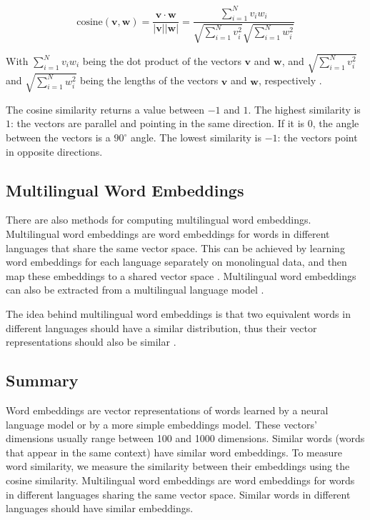 \begin{equation}
	\text{cosine}(\mathbf{v}, \mathbf{w}) =
	\frac{
	\mathbf{v} \cdot \mathbf{w}
	}{|\mathbf{v}||\mathbf{w}|}
	=
	\frac{
	\sum_{i=1}^N v_i w_i
	}
	{
	\sqrt{\sum_{i=1}^N v_i^2} \sqrt{\sum_{i=1}^N w_i^2}
	}	
\end{equation}

With $\sum_{i=1}^Nv_iw_i$ being the dot product of the vectors $\mathbf{v}$ and $\mathbf{w}$, and $\sqrt{\sum_{i=1}^N v_i^2}$ and $\sqrt{\sum_{i=1}^N w_i^2}$ being the lengths of the vectors $\mathbf{v}$ and $\mathbf{w}$, respectively \autocite[103-104]{jurafsky-2019}.

The cosine similarity returns a value between $-1$ and $1$. 
The highest  similarity is \(1\): the vectors are parallel and pointing in the same direction. 
If it is $0$, the angle between the vectors is a $90^\circ$ angle. 
The lowest similarity is $-1$: the vectors point in opposite directions.

\subsection{Multilingual Word Embeddings}
There are also methods for computing multilingual word embeddings. 
Multilingual word embeddings are word embeddings for words in different languages that share the same vector space. 
This can be achieved by learning word embeddings for each language separately on monolingual data, and then map these embeddings to a shared vector space \autocite{artetxe-etal-2018-robust}. 
Multilingual word embeddings can also be extracted from a multilingual language model \autocite{jalili-sabet-etal-2020-simalign}.

The idea behind multilingual word embeddings is that two equivalent words in different languages should have a similar distribution, thus their vector representations should also be similar \autocite{artetxe-etal-2018-robust}. 

\subsection{Summary}
Word embeddings are vector representations of words learned by a neural language model or by a more simple embeddings model. 
These vectors' dimensions usually range between 100 and 1000 dimensions. 
Similar words (words that appear in the same context) have similar word embeddings. 
To measure word similarity, we measure the similarity between their embeddings using the cosine similarity.
Multilingual word embeddings are word embeddings for words in different languages  sharing the same vector space. 
Similar words in different languages should have similar embeddings.

